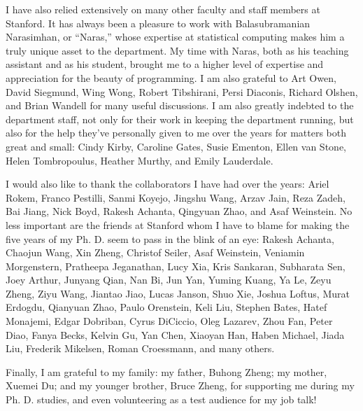 \documentclass[12pt]{report}
\begin{document}
I have also relied extensively on many other faculty and staff members
at Stanford.  It has always been a pleasure to work with
Balasubramanian Narasimhan, or ``Naras,'' whose expertise at
statistical computing makes him a truly unique asset to the
department.  My time with Naras, both as his teaching assistant and as
his student, brought me to a higher level of expertise and
appreciation for the beauty of programming.  I am also grateful to Art
Owen, David Siegmund, Wing Wong, Robert Tibshirani, Persi Diaconis,
Richard Olshen, and Brian Wandell for many useful discussions.  I am
also greatly indebted to the department staff, not only for their work
in keeping the department running, but also for the help they've
personally given to me over the years for matters both great and
small: Cindy Kirby, Caroline Gates, Susie Ementon, Ellen van Stone,
Helen Tombropoulus, Heather Murthy, and Emily Lauderdale.

I would also like to thank the collaborators I have had over the
years: Ariel Rokem, Franco Pestilli, Sanmi Koyejo, Jingshu Wang, Arzav
Jain, Reza Zadeh, Bai Jiang, Nick Boyd, Rakesh Achanta, Qingyuan Zhao,
and Asaf Weinstein.  No less important are the friends at Stanford
whom I have to blame for making the five years of my Ph. D. seem to
pass in the blink of an eye: Rakesh Achanta, Chaojun Wang, Xin Zheng,
Christof Seiler, Asaf Weinstein, Veniamin Morgenstern, Pratheepa
Jeganathan, Lucy Xia, Kris Sankaran, Subharata Sen, Joey Arthur,
Junyang Qian, Nan Bi, Jun Yan, Yuming Kuang, Ya Le, Zeyu Zheng, Ziyu
Wang, Jiantao Jiao, Lucas Janson, Shuo Xie, Joshua Loftus, Murat
Erdogdu, Qianyuan Zhao, Paulo Orenstein, Keli Liu, Stephen Bates,
Hatef Monajemi, Edgar Dobriban, Cyrus DiCiccio, Oleg Lazarev, Zhou
Fan, Peter Diao, Fanya Becks, Kelvin Gu, Yan Chen, Xiaoyan Han, Haben
Michael, Jiada Liu, Frederik Mikelsen, Roman Croessmann, and many
others.

Finally, I am grateful to my family: my father, Buhong Zheng; my
mother, Xuemei Du; and my younger brother, Bruce Zheng, for supporting
me during my Ph. D. studies, and even volunteering as a test audience
for my job talk!


    \afterpreface


 

 
 
 
\end{document}
